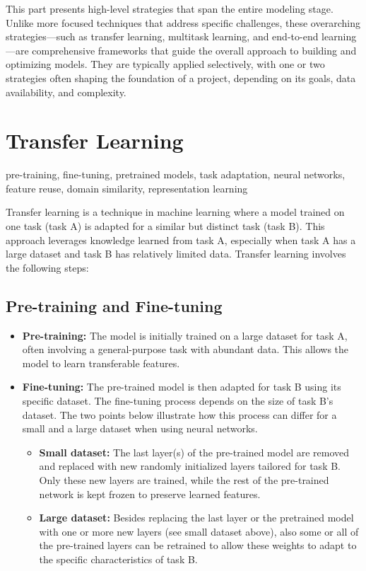 \documentclass[12pt,openany]{book}
\begin{document}
This part presents high-level strategies that span the entire modeling stage. Unlike more focused techniques that address specific challenges, these overarching strategies—such as transfer learning, multitask learning, and end-to-end learning—are comprehensive frameworks that guide the overall approach to building and optimizing models. They are typically applied selectively, with one or two strategies often shaping the foundation of a project, depending on its goals, data availability, and complexity.



\section{Transfer Learning}

\begin{keywordsbox}
pre-training, fine-tuning, pretrained models, task adaptation, neural networks, feature reuse, domain similarity, representation learning
\end{keywordsbox}

Transfer learning is a technique in machine learning where a model trained on one task (task A) is adapted for a similar but distinct task (task B). This approach leverages knowledge learned from task A, especially when task A has a large dataset and task B has relatively limited data. Transfer learning involves the following steps:


\subsection{Pre-training and Fine-tuning}

\begin{itemize}
    \item \textbf{Pre-training:} The model is initially trained on a large dataset for task A, often involving a general-purpose task with abundant data. This allows the model to learn transferable features.
    \item \textbf{Fine-tuning:} The pre-trained model is then adapted for task B using its specific dataset. The fine-tuning process depends on the size of task B’s dataset. The two points below illustrate how this process can differ for a small and a large dataset when using neural networks.
    \begin{itemize}
        \item \textbf{Small dataset:} The last layer(s) of the pre-trained model are removed and replaced with new randomly initialized layers tailored for task B. Only these new layers are trained, while the rest of the pre-trained network is kept frozen to preserve learned features.
        \item \textbf{Large dataset:} Besides replacing the last layer or the pretrained model with one or more new layers (see small dataset above), also some or all of the pre-trained layers can be retrained to allow these weights to adapt to the specific characteristics of task B.
    \end{itemize}
\end{itemize}
\end{document}
